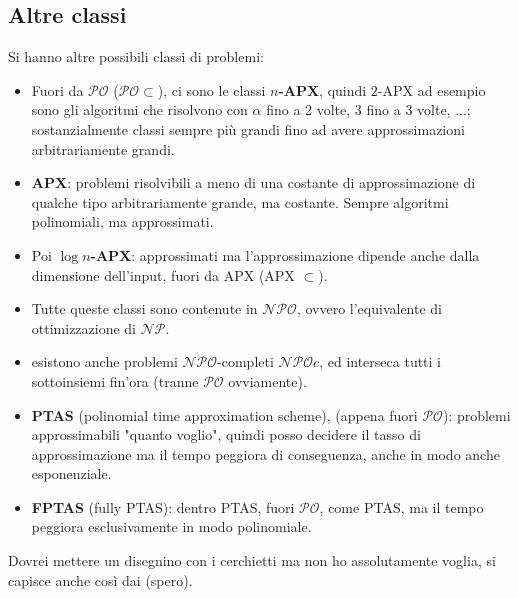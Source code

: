 \documentclass[11pt]{article}
\begin{document}
	\newpage
	
	\subsection{Altre classi}
	Si hanno altre possibili classi di problemi: 
	\begin{itemize}
		\item Fuori da $\mathcal{PO}$ ($\mathcal{PO} \subset$), ci sono le classi \textbf{$n$-APX}, quindi $2$-APX ad esempio sono gli algoritmi che risolvono con $\alpha$ fino a 2 volte, 3 fino a 3 volte, ...; sostanzialmente classi sempre più grandi fino ad avere approssimazioni arbitrariamente grandi.\\
		
		\item \textbf{APX}: problemi risolvibili a meno di una costante di approssimazione di qualche tipo arbitrariamente grande, ma costante. Sempre algoritmi polinomiali, ma approssimati.\\
		
		\item Poi \textbf{$\log n$-APX}: approssimati ma l'approssimazione dipende anche dalla dimensione dell'input, fuori da APX (APX $\subset$).\\
		
		\item Tutte queste classi sono contenute in $\mathcal{NPO}$, ovvero l'equivalente di ottimizzazione di $\mathcal{NP}$.\\
		 
		\item esistono anche problemi $\mathcal{NPO}$-completi $\mathcal{NPO}c$, ed interseca tutti i sottoinsiemi fin'ora (tranne $\mathcal{PO}$ ovviamente).\\
		
		\item \textbf{PTAS} (polinomial time approximation scheme), (appena fuori $\mathcal{PO}$): problemi approssimabili "quanto voglio", quindi posso decidere il tasso di approssimazione ma il tempo peggiora di conseguenza, anche in modo anche esponenziale.\\
		
		\item \textbf{FPTAS} (fully PTAS): dentro PTAS, fuori $\mathcal{PO}$, come PTAS, ma il tempo peggiora esclusivamente in modo polinomiale.\\
	\end{itemize}
	
	Dovrei mettere un disegnino con i cerchietti ma non ho assolutamente voglia, si capisce anche così dai (spero).\\
	
\end{document}
